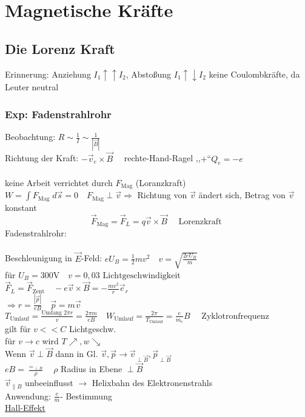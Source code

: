 \documentclass[titlepage,12pt,a4paper,ngerman]{report}
\newcommand{\tx}[1]{\textrm{#1}}
\begin{document}
\section{Magnetische Kräfte}
\subsection{Die Lorenz Kraft}
Erinnerung: Anziehung $  I_1 \uparrow \uparrow I_2 $, Abstoßung $ I_1 \uparrow \downarrow I_2 $ keine Coulombkräfte, da Leuter neutral
\subsubsection{Exp: Fadenstrahlrohr}
Beobachtung: $  R \sim \frac{1}{I} \sim \frac{1}{|\vec{B}|} $\\
Richtung der Kraft: $ -\vec{v}_e \times \vec{B} \quad $ rechte-Hand-Ragel ,,$ + $``$ Q_e = -e $\\\\
keine Arbeit verrichtet durch $ F_{\tx{Mag}}  $ (Loranzkraft) $ W = \int F_{\tx{Mag}} \; d\vec{s} = 0\quad F_{\tx{Mag}} \perp \vec{v} \Rightarrow $ Richtung von $ \vec{v} $ ändert sich, Betrag von $ \vec{v} $ konstant
$$\boxed{\vec{F}_{\tx{Mag}} = \vec{F}_L = q \vec{v} \times \vec{B}} \quad \tx{ Lorenzkraft }$$
Fadenstrahlrohr:\\
\\Beschleunigung in $ \vec{E} $-Feld: $ eU_B = \frac{1}{2} m v^2 \quad v = \sqrt{\frac{2 e U _B}{m}} $\\
für $ U_B = 300 \tx{V} \quad v = 0,03 \tx{ Lichtgeschwindigkeit } $\\
$ \vec{F}_L  = \vec{F} _{\tx{Zent}} \quad -e \vec{v} \times \vec{B} = - \frac{mv^2}{r} \vec{e}_r$\\
$ \Rightarrow r = \frac{|\vec{p}|}{e B } \quad \vec{p} = m \vec{v} $\\
$ T_{\tx{Umlauf}} = \frac{\tx{Umfang } 2 \pi r }{v} = \frac{ 2\pi m}{e B} \quad W _{\tx{Umlauf}} = \frac{2\pi }{T _{\tx{Umlauf}}} = \frac{e}{m_e} B \quad \tx{ Zyklotronfrequenz} $\\
gilt für $  v<<C $ Lichtgeschw.\\
für $ v \rightarrow c $ wird $ T \nearrow , w \searrow $\\
Wenn $ \vec{v} \perp \vec{B} $  dann in Gl. $ \vec{v},\vec{p} \rightarrow \vec{v}_{\perp \vec{B}}, \vec{p}_{\perp \vec{B}} $\\
$ eB = \frac{=_{\perp B}}{\rho} \quad \rho $ Radius in Ebene $ \perp \vec{B} $\\
$ \vec{v}_{\parallel B} $ unbeeinflusst $ \rightarrow $ Helixbahn des Elektronenstrahls\\
Anwendung: $ \frac{e}{m} $- Bestimmung\\
\underline{Hall-Effekt}
\end{document}
